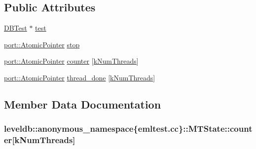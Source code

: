 \subsection*{Public Attributes}
\begin{DoxyCompactItemize}
\item 
\hyperlink{classleveldb_1_1_d_b_test}{D\+B\+Test} $\ast$ \hyperlink{structleveldb_1_1anonymous__namespace_02emltest_8cc_03_1_1_m_t_state_a636a8dabfcb131bc2b3a49f7438118a7}{test}
\item 
\hyperlink{classleveldb_1_1port_1_1_atomic_pointer}{port\+::\+Atomic\+Pointer} \hyperlink{structleveldb_1_1anonymous__namespace_02emltest_8cc_03_1_1_m_t_state_a44404b008dabef302d27f05a438a39c5}{stop}
\item 
\hyperlink{classleveldb_1_1port_1_1_atomic_pointer}{port\+::\+Atomic\+Pointer} \hyperlink{structleveldb_1_1anonymous__namespace_02emltest_8cc_03_1_1_m_t_state_a0494ea93099ec822e22c7cdf51970cb3}{counter} \mbox{[}\hyperlink{namespaceleveldb_1_1anonymous__namespace_02emltest_8cc_03_a26fa4b352f376c5bc4b01fdda6123d79}{k\+Num\+Threads}\mbox{]}
\item 
\hyperlink{classleveldb_1_1port_1_1_atomic_pointer}{port\+::\+Atomic\+Pointer} \hyperlink{structleveldb_1_1anonymous__namespace_02emltest_8cc_03_1_1_m_t_state_aed319e3fbe8770f3bcdf86c03cfda1b3}{thread\+\_\+done} \mbox{[}\hyperlink{namespaceleveldb_1_1anonymous__namespace_02emltest_8cc_03_a26fa4b352f376c5bc4b01fdda6123d79}{k\+Num\+Threads}\mbox{]}
\end{DoxyCompactItemize}


\subsection{Member Data Documentation}
\hypertarget{structleveldb_1_1anonymous__namespace_02emltest_8cc_03_1_1_m_t_state_a0494ea93099ec822e22c7cdf51970cb3}{}
\subsubsection[{counter}]{ leveldb\+::anonymous\+\_\+namespace\{emltest.\+cc\}\+::M\+T\+State\+::counter\mbox{[}{\bf k\+Num\+Threads}\mbox{]}}\label{structleveldb_1_1anonymous__namespace_02emltest_8cc_03_1_1_m_t_state_a0494ea93099ec822e22c7cdf51970cb3}
\hypertarget{structleveldb_1_1anonymous__namespace_02emltest_8cc_03_1_1_m_t_state_a44404b008dabef302d27f05a438a39c5}{}
